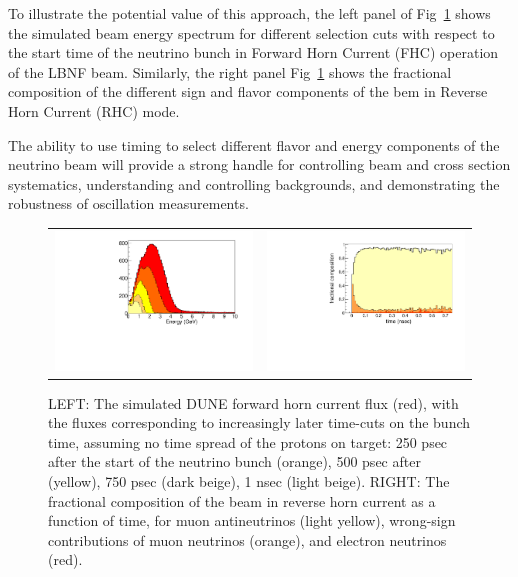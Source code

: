 To illustrate the potential value of this approach, the left panel of Fig~\ref{fig:timeslices1} shows the simulated beam energy spectrum for different selection cuts with respect to the start time of the neutrino bunch in Forward Horn Current (FHC) operation of the LBNF beam. Similarly, the right panel Fig~\ref{fig:timeslices1} shows the fractional composition of the different sign and flavor components of the bem in Reverse Horn Current (RHC) mode. 

The ability to use timing to select different flavor and energy components of the neutrino beam will provide a strong  handle for controlling beam and cross section systematics, understanding and controlling backgrounds, and demonstrating the robustness of oscillation measurements.

\begin{figure}[t]
	\begin{center}
        	\begin{tabular}{c c}
        \includegraphics[width=0.5\linewidth]{Figures/DUNEbeam_truetimingB.pdf} &
        \includegraphics[width=0.5\linewidth]{Figures/wrongsigncomposition_RHC.pdf} \\
	\end{tabular}
	\end{center}
	\caption{LEFT: The simulated  DUNE forward horn current flux (red), with the
          fluxes corresponding to increasingly later time-cuts on the
          bunch time, assuming no time spread of the protons on
          target: 250 psec after the start of the neutrino bunch
          (orange), 500 psec after (yellow), 750 psec (dark beige), 1
          nsec (light beige). RIGHT: The fractional composition of the beam in reverse horn current as a function of time, for muon antineutrinos (light yellow), wrong-sign contributions of muon neutrinos (orange), and electron neutrinos (red). }
		\label{fig:timeslices1}
\end{figure}

